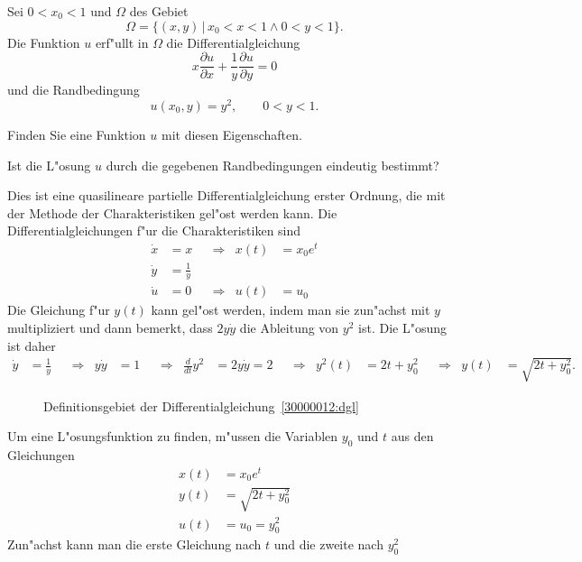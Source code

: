 Sei $0 < x_0 < 1$ und $\Omega$ des Gebiet
\[
\Omega=\{ (x,y)\,|\, x_0<x<1\wedge 0 < y < 1\}.
\]
Die Funktion $u$ erf"ullt in $\Omega$ die Differentialgleichung
\begin{equation}
x\frac{\partial u}{\partial x}
+
\frac1y\frac{\partial u}{\partial y}
=
0
\label{30000012:dgl}
\end{equation}
und die Randbedingung 
\[
u(x_0,y)=y^2,\qquad 0<y<1.
\]
\begin{teilaufgaben}
\item
Finden Sie eine Funktion $u$ mit diesen Eigenschaften.
\item
Ist die L"osung $u$ durch die gegebenen Randbedingungen eindeutig bestimmt?
\end{teilaufgaben}

\begin{loesung}
Dies ist eine quasilineare partielle Differentialgleichung erster Ordnung,
die mit der Methode der Charakteristiken gel"ost werden kann.
Die Differentialgleichungen f"ur die Charakteristiken sind
\[
\begin{aligned}
\dot x &= x       &&\Rightarrow&   x(t) &= x_0 e^t \\
\dot y &= \frac1y &&           &        &          \\
\dot u &= 0       &&\Rightarrow&   u(t) &= u_0
\end{aligned}
\]
Die Gleichung f"ur $y(t)$ kann gel"ost werden, indem man sie zun"achst mit
$y$ multipliziert und dann bemerkt, dass $2y\dot y$ die Ableitung von $y^2$
ist.
Die L"osung ist daher
\begin{align*}
\dot y &= \frac1y
&&\Rightarrow&
y\dot y &= 1
&&\Rightarrow&
\frac{d}{dt}y^2&=2y\dot y=2
&&\Rightarrow&
y^2(t) &= 2t + y_0^2
&&\Rightarrow&
y(t)&=\sqrt{2t+y_0^2}.
\end{align*}
\begin{figure}
\centering
{}
\caption{Definitionsgebiet der Differentialgleichung~\ref{30000012:dgl}
\label{30000012:domain}}
\end{figure}
\begin{teilaufgaben}
\item
Um eine L"osungsfunktion zu finden, m"ussen die Variablen $y_0$ und $t$ aus den
Gleichungen
\begin{align*}
x(t) &= x_0e^t\\
y(t)&=\sqrt{2t+y_0^2}\\
u(t)&=u_0 = y_0^2
\end{align*}
Zun"achst kann man die erste Gleichung nach $t$ und die zweite nach $y_0^2$

\end{teilaufgaben}
\end{loesung}
